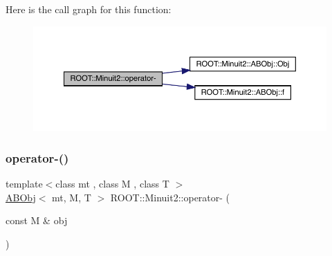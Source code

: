 Here is the call graph for this function\+:
\nopagebreak
\begin{figure}[H]
\begin{center}
\leavevmode
\includegraphics[width=350pt]{d6/d3a/namespaceROOT_1_1Minuit2_ad72d0b214406e2325a87fe10b052b9ad_cgraph}
\end{center}
\end{figure}
\mbox{\label{namespaceROOT_1_1Minuit2_a95351951cc1f33b0a2904a47adacd999}} 
\subsubsection{\texorpdfstring{operator-\/()}{operator-()}\hspace{0.1cm}{\footnotesize\ttfamily [4/4]}}
{\footnotesize\ttfamily template$<$class mt , class M , class T $>$ \\
\mbox{\hyperlink{classROOT_1_1Minuit2_1_1ABObj}{A\+B\+Obj}}$<$ mt, M, T $>$ R\+O\+O\+T\+::\+Minuit2\+::operator-\/ (\begin{DoxyParamCaption}\item[{const M \&}]{obj }\end{DoxyParamCaption})\hspace{0.3cm}{\ttfamily [inline]}}

\mbox{\label{namespaceROOT_1_1Minuit2_afaff6ec8d1115025bd92259424674647}} 
